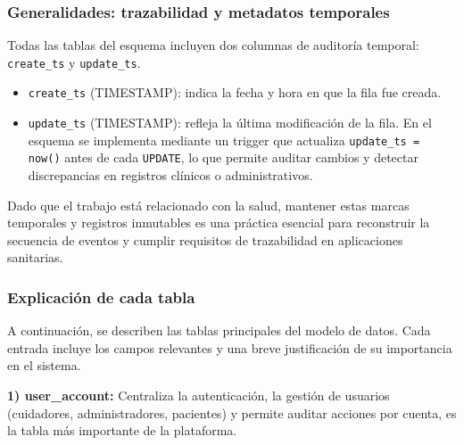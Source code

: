 \documentclass[12pt, a4paper]{article}
\begin{document}
\subsubsection{Generalidades: trazabilidad y metadatos temporales}

Todas las tablas del esquema incluyen dos columnas de auditoría temporal: \texttt{create\_ts} y \texttt{update\_ts}.  

\begin{itemize}
	\item \texttt{create\_ts} (TIMESTAMP): indica la fecha y hora en que la fila fue creada. 
	\item \texttt{update\_ts} (TIMESTAMP): refleja la última modificación de la fila. En el esquema se implementa mediante un trigger que actualiza \texttt{update\_ts = now()} antes de cada \texttt{UPDATE}, lo que permite auditar cambios y detectar discrepancias en registros clínicos o administrativos.
\end{itemize}

Dado que el trabajo está relacionado con la salud, mantener estas marcas temporales y registros inmutables es una práctica esencial para reconstruir la secuencia de eventos y cumplir requisitos de trazabilidad en aplicaciones sanitarias.

\subsubsection{Explicación de cada tabla}
A continuación, se describen las tablas principales del modelo de datos.  
Cada entrada incluye los campos relevantes y una breve justificación de su importancia en el sistema.



\textbf{1) user\_account:} Centraliza la autenticación, la gestión de usuarios (cuidadores, administradores, pacientes) y permite auditar acciones por cuenta, es la tabla más importante de la plataforma.
\end{document}
